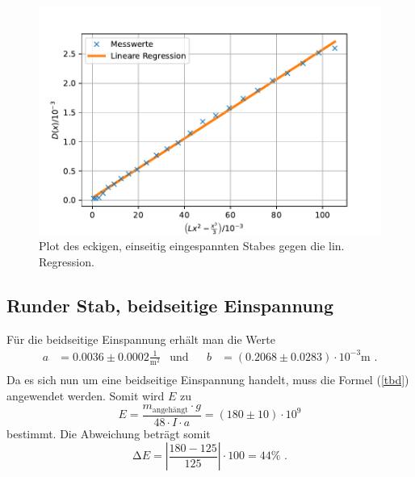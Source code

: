 \begin{figure}[H]
  \centering
  \includegraphics{pictures/Lineare Regression2.pdf}
  \caption{Plot des eckigen, einseitig eingespannten Stabes gegen die lin. Regression.}
  \label{fig:plot2}
\end{figure}


\subsection{Runder Stab, beidseitige Einspannung}

Für die beidseitige Einspannung erhält man die Werte
\begin{align*}
  a &= 0.0036 ± 0.0002 \frac{1}{\unit{\meter\squared}} & \text{und}& & b&= (0.2068 ± 0.0283) \cdot 10^{-3} \unit\meter \text{ .} \\
\end{align*}
Da es sich nun um eine beidseitige Einspannung handelt, muss die Formel (\ref{tbd}) angewendet werden.
Somit wird $E$ zu
\begin{equation*}
  E = \frac{m_\text{angehängt} \cdot g}{48 \cdot I \cdot a} = (180 \pm 10) \cdot 10^{9}
\end{equation*}
bestimmt. Die Abweichung beträgt somit
\begin{equation*}
  \increment E = \left|\frac{180 - 125}{125}\right| \cdot 100 = 44 \% \text{ .}
\end{equation*}

